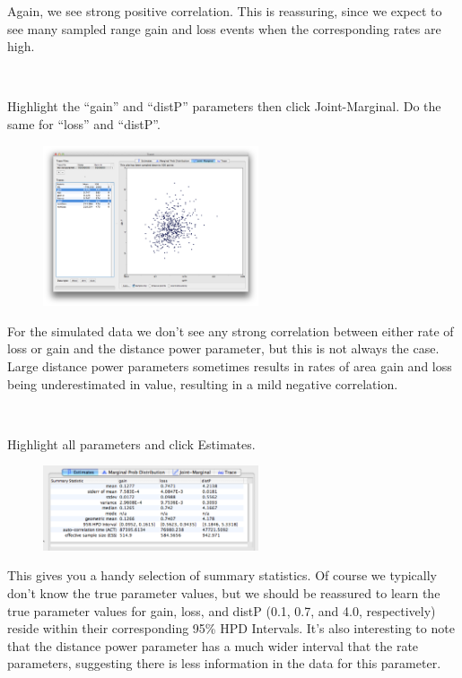 \documentclass[11pt]{article}
\newcommand{\impmark}{\strut\vadjust{\domark}}
\newcommand{\domark}{%
  \vbox to 0pt{
    \kern-\dp\strutbox
    \smash{\llap{$\rightarrow$\kern1em}}
    \vss
  }%
}
\begin{document}
Again, we see strong positive correlation.
This is reassuring, since we expect to see many sampled range gain and loss events when the corresponding rates are high.

\noindent \\ \impmark  Highlight the ``gain'' and ``distP'' parameters then click Joint-Marginal. Do the same for ``loss'' and ``distP''.\\

\begin{figure}[H]
\centering
\includegraphics[width=2.5in]{figures/gain_distp}
\end{figure}

For the simulated data we don't see any strong correlation between either rate of loss or gain and the distance power parameter, but this is not always the case.
Large distance power parameters sometimes results in rates of area gain and loss being underestimated in value, resulting in a mild negative correlation.

\noindent \\ \impmark Highlight all parameters and click Estimates.

\begin{figure}[H]
\centering
\includegraphics[width=2.5in]{figures/hpd}
\end{figure}

This gives you a handy selection of summary statistics.
Of course we typically don't know the true parameter values, but we should be reassured to learn the true parameter values for gain, loss, and distP (0.1, 0.7, and 4.0, respectively) reside within their corresponding 95\% HPD Intervals.
It's also interesting to note that the distance power parameter has a much wider interval that the rate parameters, suggesting there is less information in the data for this parameter.
\end{document}
